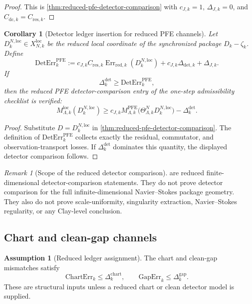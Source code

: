 \documentclass[11pt]{article}
\numberwithin{equation}{section}
\theoremstyle{plain}
\newtheorem{corollary}[theorem]{Corollary}
\theoremstyle{definition}
\newtheorem{assumption}[theorem]{Assumption}
\theoremstyle{remark}
\newtheorem{remark}[theorem]{Remark}
\newcommand{\loc}{\mathrm{loc}}
\newcommand{\detc}{\mathrm{det}}
\newcommand{\chart}{\mathrm{chart}}
\newcommand{\gap}{\mathrm{gap}}
\begin{document}
\begin{proof}
This is \cref{thm:reduced-pfe-detector-comparison} with
\(c_{J,k}=1\), \(\Delta_{J,k}=0\), and
\(C_{\mathrm{dc},k}=C_{\mathrm{res},k}\).
\end{proof}

\begin{corollary}[Detector ledger insertion for reduced PFE channels]
\label{cor:reduced-pfe-detector-ledger}
Let \(D_k^{N,\loc}\in X_{N,k}^{\loc}\) be the reduced local coordinate of the
synchronized package \(D_k-\zeta_k\).  Define
\[
  \mathrm{DetErr}_k^{\mathrm{PFE}}
  :=
  c_{J,k}C_{\mathrm{res},k}
  \operatorname{Err}_{\mathrm{red},k}(D_k^{N,\loc})
  +
  c_{J,k}\Delta_{\mathrm{det},k}
  +
  \Delta_{J,k}.
\]
If
\[
  \Delta_k^{\detc}
  \ge
  \mathrm{DetErr}_k^{\mathrm{PFE}},
\]
then the reduced PFE detector-comparison entry of the one-step admissibility
checklist is verified:
\[
  M_{\Lambda,k}^{\loc}(D_k^{N,\loc})
  \ge
  c_{J,k}
  M_{\Lambda,k}^{\mathrm{PFE}}
  \bigl(\Theta_{\Lambda,k}^{N}D_k^{N,\loc}\bigr)
  -
  \Delta_k^{\detc}.
\]
\end{corollary}

\begin{proof}
Substitute \(D=D_k^{N,\loc}\) in
\cref{thm:reduced-pfe-detector-comparison}.  The definition of
\(\mathrm{DetErr}_k^{\mathrm{PFE}}\) collects exactly the residual,
commutator, and observation-transport losses.  If
\(\Delta_k^{\detc}\) dominates this quantity, the displayed detector
comparison follows.
\end{proof}

\begin{remark}[Scope of the reduced detector comparison]
\label{rem:reduced-detector-scope}
are reduced finite-dimensional detector-comparison statements.  They do not
prove detector comparison for the full infinite-dimensional Navier--Stokes
package geometry.  They also do not prove scale-uniformity, singularity
extraction, Navier--Stokes regularity, or any Clay-level conclusion.
\end{remark}

\subsection{Chart and clean-gap channels}

\begin{assumption}[Reduced ledger assignment]\label{ass:reduced-detector}
The chart and clean-gap mismatches satisfy
\[
  \mathrm{ChartErr}_k\le\Delta_k^{\chart},\qquad
  \mathrm{GapErr}_k\le\Delta_k^{\gap}.
\]
These are structural inputs unless a reduced chart or clean detector model is
supplied.
\end{assumption}
\end{document}
